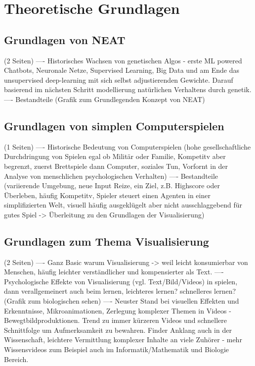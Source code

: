 \chapter{Theoretische Grundlagen}
\label{chapter:2}

\section{Grundlagen von NEAT}
(2 Seiten)
---- Historisches Wachsen von genetischen Algos - erste ML powered Chatbots, Neuronale Netze, Supervised Learning, Big Data und am Ende das unsupervised deep-learning mit sich selbst adjustierenden Gewichte. Darauf basierend im nächsten Schritt modellierung natürlichen Verhaltens durch genetik. 
---- Bestandteile (Grafik zum Grundlegenden Konzept von NEAT)

\section{Grundlagen von simplen Computerspielen}
(1 Seiten)
---- Historische Bedeutung von Computerspielen (hohe gesellschaftliche Durchdringung von Spielen egal ob Militär oder Familie, Kompetitv aber begrenzt, zuerst Brettspiele dann Computer, soziales Tun, Vorfornt in der Analyse von menschlichen psychologischen Verhalten)
---- Bestandteile (variierende Umgebung, neue Input Reize, ein Ziel, z.B. Highscore oder Überleben, häufig Kompetitv, Spieler steuert einen Agenten in einer simplifizierten Welt, visuell häufig ausgeklügelt aber nicht ausschlaggebend für gutes Spiel -> Überleitung zu den Grundlagen der Visualisierung)

\section{Grundlagen zum Thema Visualisierung}
(2 Seiten)
---- Ganz Basic warum Visualisierung -> weil leicht konsumierbar von Menschen, häufig leichter verständlicher und kompensierter als Text. 
---- Psychologische Effekte von Visualisierung (vgl. Text/Bild/Videos) in spielen, dann verallgemeinert auch beim lernen, leichteres lernen? schnelleres lernen? (Grafik zum biologischen sehen) 
---- Neuster Stand bei visuellen Effekten und Erkenntnisse, Mikroanimationen, Zerlegung komplexer Themen in Videos - Bewegtbildproduktionen. Trend zu immer kürzeren Videos und schnellere Schnittfolge um Aufmerksamkeit zu bewahren. Finder Anklang auch in der Wissenschaft, leichtere Vermittlung komplexer Inhalte an viele Zuhörer - mehr Wissensvideos zum Beispiel auch im Informatik/Mathematik und Biologie Bereich. 